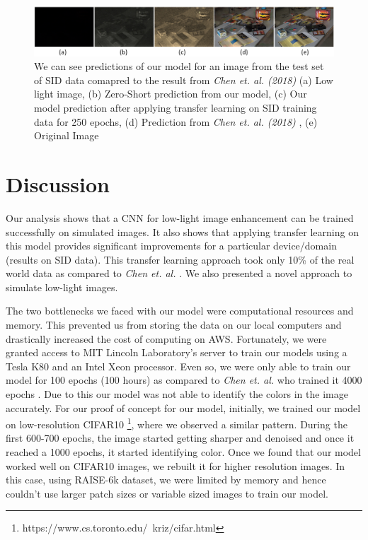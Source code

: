 \documentclass{article}
\begin{document}
\begin{figure}[t!]
  \centering
  \includegraphics[scale=0.42]{Final_predictions}
  \caption{We can see predictions of our model for an image from the test set of SID data comapred to the result from \textit{Chen et. al. (2018)} \cite{chen2018learning} (a) Low light image, (b) Zero-Short prediction from our model, (c) Our model prediction after applying transfer learning on SID training data for 250 epochs, (d) Prediction from \textit{Chen et. al. (2018)} \cite{chen2018learning}, (e) Original Image}
  \label{fig:final_predictions}
\end{figure}

\section{Discussion}
Our analysis shows that a CNN for low-light image enhancement can be trained successfully on simulated images. It also shows that applying transfer learning on this model provides significant improvements for a particular device/domain (results on SID data). This transfer learning approach took only 10\% of the real world data as compared to \textit{Chen et. al.} \cite{chen2018learning}. We also presented a novel approach to simulate low-light images.

The two bottlenecks we faced with our model were computational resources and memory. This prevented us from storing the data on our local computers and drastically increased the cost of computing on AWS. Fortunately, we were granted access to MIT Lincoln Laboratory's server to train our models using a Tesla K80 and an Intel Xeon processor. Even so, we were only able to train our model for 100 epochs (100 hours) as compared to \textit{Chen et. al.}  who trained it 4000 epochs \cite{chen2018learning}. Due to this our model was not able to identify the colors in the image accurately. For our proof of concept for our model, initially, we trained our model on low-resolution CIFAR10 \footnote{https://www.cs.toronto.edu/~kriz/cifar.html}, where we observed a similar pattern. During the first 600-700 epochs, the image started getting sharper and denoised and once it reached a 1000 epochs, it started identifying color. Once we found that our model worked well on CIFAR10 images, we rebuilt it for higher resolution images. In this case, using RAISE-6k dataset, we were limited by memory and hence couldn't use larger patch sizes or variable sized images to train our model. 
\end{document}
